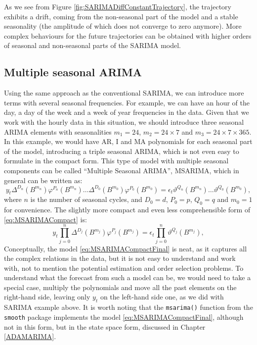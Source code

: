 \documentclass[]{book}
\theoremstyle{definition}
\theoremstyle{definition}
\theoremstyle{definition}
\theoremstyle{definition}
\theoremstyle{remark}
\begin{document}
As we see from Figure \ref{fig:SARIMADiffConstantTrajectory}, the trajectory exhibits a drift, coming from the non-seasonal part of the model and a stable seasonality (the amplitude of which does not converge to zero anymore). More complex behaviours for the future trajectories can be obtained with higher orders of seasonal and non-seasonal parts of the SARIMA model.

\hypertarget{MSARIMA}{%
\subsection{Multiple seasonal ARIMA}\label{MSARIMA}}

Using the same approach as the conventional SARIMA, we can introduce more terms \citep[similar to how][ did it]{Taylor2003a} with several seasonal frequencies. For example, we can have an hour of the day, a day of the week and a week of year frequencies in the data. Given that we work with the hourly data in this situation, we should introduce three seasonal ARIMA elements with seasonalities \(m_1=24\), \(m_2=24 \times 7\) and \(m_3=24 \times 7 \times 365\). In this example, we would have AR, I and MA polynomials for each seasonal part of the model, introducing a triple seasonal ARIMA, which is not even easy to formulate in the compact form. This type of model with multiple seasonal components can be called ``Multiple Seasonal ARIMA'', MSARIMA, which in general can be written as:
\begin{equation}
  y_t \Delta^{D_n}(B^{m_n}) \varphi^{P_n}(B^{m_n}) \dots \Delta^{D_0}(B^{m_0}) \varphi^{P_0}(B^{m_0}) = \epsilon_t \vartheta^{Q_n}(B^{m_n}) \dots \vartheta^{Q_0}(B^{m_0}) ,
  \label{eq:MSARIMACompact}
\end{equation}
where \(n\) is the number of seasonal cycles, and \(D_0=d\), \(P_0=p\), \(Q_0=q\) and \(m_0=1\) for convenience. The slightly more compact and even less comprehensible form of \eqref{eq:MSARIMACompact} is:
\begin{equation}
  y_t \prod_{j=0}^n \Delta^{D_j} (B^{m_j}) \varphi^{P_j}(B^{m_j}) = \epsilon_t \prod_{j=0}^n \vartheta^{Q_j}(B^{m_j}) ,
  \label{eq:MSARIMACompactFinal}
\end{equation}
Conceptually, the model \eqref{eq:MSARIMACompactFinal} is neat, as it captures all the complex relations in the data, but it is not easy to understand and work with, not to mention the potential estimation and order selection problems. To understand what the forecast from such a model can be, we would need to take a special case, multiply the polynomials and move all the past elements on the right-hand side, leaving only \(y_t\) on the left-hand side one, as we did with SARIMA example above. It is worth noting that the \texttt{msarima()} function from the \texttt{smooth} package implements the model \eqref{eq:MSARIMACompactFinal}, although not in this form, but in the state space form, discussed in Chapter \ref{ADAMARIMA}.
\end{document}
